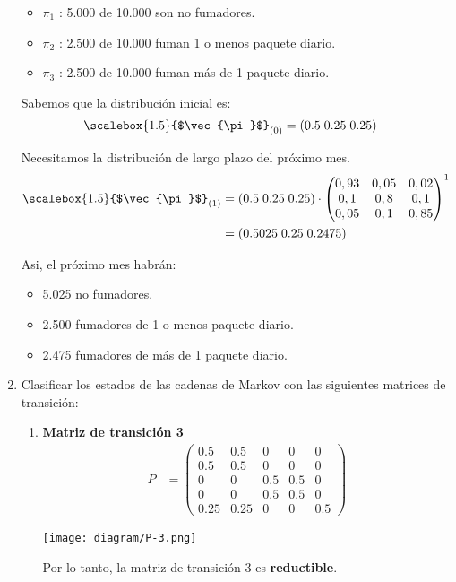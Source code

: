 \documentclass{templateNote}
\begin{document}
\begin{enumerate}
    \begin{itemize}
        \item $\pi_1$ : 5.000 de 10.000 son no fumadores.
        \item $\pi_2$ : 2.500 de 10.000 fuman 1 o menos paquete diario.
        \item $\pi_3$ : 2.500 de 10.000 fuman más de 1 paquete diario.
    \end{itemize}
    Sabemos que la distribución inicial es:
    \begin{align*}
        \scalebox{1.5}{$\vec{\pi}$}_{(0)} &= \left(0.5 \; 0.25 \; 0.25\right)
    \end{align*}

    Necesitamos la distribución de largo plazo del próximo mes.
    \begin{align*}
        \scalebox{1.5}{$\vec{\pi}$}_{(1)} &= \left(0.5 \; 0.25 \; 0.25\right) \cdot \left(\begin{matrix}
            0,93 & 0,05 & 0,02 \\
            0,1 & 0,8 & 0,1 \\
            0,05 & 0,1 & 0,85
        \end{matrix}\right)^1 \\
        &= \left(0.5025 \; 0.25 \; 0.2475\right)
    \end{align*}

    Asi, el próximo mes habrán:
    \begin{itemize}
        \item 5.025 no fumadores.
        \item 2.500 fumadores de 1 o menos paquete diario.
        \item 2.475 fumadores de más de 1 paquete diario.
    \end{itemize}

    \newpage
    \item Clasificar los estados de las cadenas de Markov con las siguientes matrices de transición:
    \begin{enumerate}
        \item \textbf{Matriz de transición 3}
        \begin{align*}
            P &= \left(\begin{matrix}
                0.5 & 0.5 & 0 & 0 & 0 \\
                0.5 & 0.5 & 0 & 0 & 0 \\
                0 & 0 & 0.5 & 0.5 & 0 \\
                0 & 0 & 0.5 & 0.5 & 0 \\
                0.25 & 0.25 & 0 & 0 & 0.5
            \end{matrix}\right)
        \end{align*}

        \begin{center}
            \texttt{[image: diagram/P-3.png]}
        \end{center}

        Por lo tanto, la matriz de transición 3 es \textbf{reductible}.
    \end{enumerate}
\end{enumerate}
\end{document}
